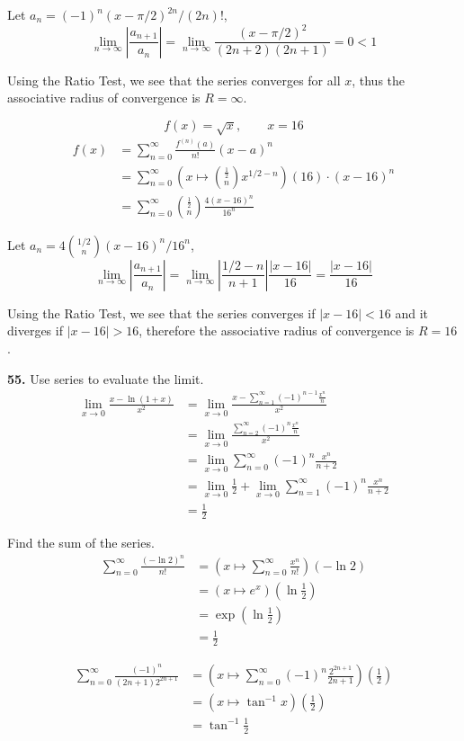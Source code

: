 \documentclass[a4paper,12pt]{article}
\begin{document}
Let $a_n = (-1)^n(x - \pi/2)^{2n}/(2n)!$,
\[\lim_{n\to\infty}\left|\frac{a_{n+1}}{a_n}\right|
= \lim_{n\to\infty}\frac{(x - \pi/2)^2}{(2n + 2)(2n + 1)}
= 0 < 1\]

Using the Ratio Test, we see that the series converges for all $x$, thus the
associative radius of convergence is $R = \infty$.

\[f(x) = \sqrt x,\qquad x = 16\tag{20}\]
\begin{align*}
   f(x)
&= \sum_{n=0}^\infty\frac{f^{(n)}(a)}{n!}(x - a)^n\\
&= \sum_{n=0}^\infty\left(x\mapsto\binom{\frac{1}{2}}{n}x^{1/2-n}\right)(16)
                    \cdot (x - 16)^n\\
&= \sum_{n=0}^\infty\binom{\frac{1}{2}}{n}\frac{4(x - 16)^n}{16^n}
\end{align*}

Let $a_n = 4\binom{1/2}{n}(x - 16)^n/16^n$,
\[\lim_{n\to\infty}\left|\frac{a_{n+1}}{a_n}\right|
= \lim_{n\to\infty}\left|\frac{1/2 - n}{n + 1}\right|\frac{|x - 16|}{16}
= \frac{|x - 16|}{16}\]

Using the Ratio Test, we see that the series converges if $|x - 16| < 16$ and
it diverges if $|x - 16| > 16$, therefore the associative radius of convergence
is $R = 16$.

\noindent\textbf{55. }Use series to evaluate the limit.
\begin{align*}
   \lim_{x \to 0}\frac{x - \ln(1 + x)}{x^2}
&= \lim_{x \to 0}\frac{x - \sum_{n=1}^\infty (-1)^{n-1}\frac{x^n}{n}}{x^2}\\
&= \lim_{x \to 0}\frac{\sum_{n=2}^\infty (-1)^n\frac{x^n}{n}}{x^2}\\
&= \lim_{x \to 0}\sum_{n=0}^\infty (-1)^n\frac{x^n}{n + 2}\\
&= \lim_{x \to 0}\frac{1}{2}
 + \lim_{x \to 0}\sum_{n=1}^\infty (-1)^n\frac{x^n}{n + 2}\\
&= \frac{1}{2}
\end{align*}

\newpage\noindent Find the sum of the series.
\begin{align*}
   \sum_{n=0}^\infty\frac{(-\ln 2)^n}{n!}
&= \left(x \mapsto \sum_{n=0}^\infty\frac{x^n}{n!}\right)(-\ln 2)\\
&= (x \mapsto e^x)\left(\ln\frac{1}{2}\right)\\
&= \exp\left(\ln\frac{1}{2}\right)\\
&= \frac{1}{2}\tag{68}
\end{align*}

\begin{align*}
\sum_{n=0}^\infty\frac{(-1)^n}{(2n + 1)2^{2n + 1}}
&= \left(x \mapsto \sum_{n=0}^\infty(-1)^n\frac{2^{2n + 1}}{2n + 1}\right)
   \left(\frac{1}{2}\right)\\
&= \left(x \mapsto \tan^{-1}x\right)\left(\frac{1}{2}\right)\\
  &= \tan^{-1}\frac{1}{2}\tag{70}
\end{align*}
\end{document}
